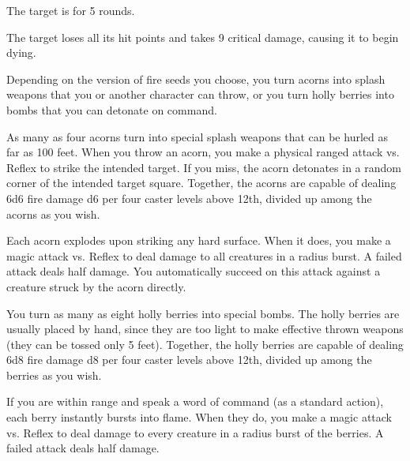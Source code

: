 \begin{spellhealthy}
    The target is \staggered for 5 rounds.
\end{spellhealthy}
\begin{spellblood}
    The target loses all its hit points and takes 9 critical damage, causing it to begin dying.
\end{spellblood}

\begin{spelleffect}
    Depending on the version of fire seeds you choose, you turn acorns into splash weapons that you or another character can throw, or you turn holly berries into bombs that you can detonate on command.
    \par {} As many as four acorns turn into special splash weapons that can be hurled as far as 100 feet. When you throw an acorn, you make a physical ranged attack vs. Reflex to strike the intended target. If you miss, the acorn detonates in a random corner of the intended target square. Together, the acorns are capable of dealing 6d6 fire damage \add d6 per four caster levels above 12th, divided up among the acorns as you wish.
    \par Each acorn explodes upon striking any hard surface. When it does, you make a magic attack vs. Reflex to deal damage to all creatures in a \areasmall radius burst. A failed attack deals half damage. You automatically succeed on this attack against a creature struck by the acorn directly.
    \par {} You turn as many as eight holly berries into special bombs. The holly berries are usually placed by hand, since they are too light to make effective thrown weapons (they can be tossed only 5 feet). Together, the holly berries are capable of dealing 6d8 fire damage \add d8 per four caster levels above 12th, divided up among the berries as you wish.
    \par If you are within \rngmed range and speak a word of command (as a standard action), each berry instantly bursts into flame. When they do, you make a magic attack vs. Reflex to deal damage to every creature in a \areamed radius burst of the berries. A failed attack deals half damage.
\end{spelleffect}
